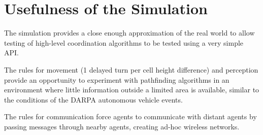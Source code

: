 \section{Usefulness of the Simulation}

The simulation provides a close enough approximation of the real world to allow testing of high-level coordination algorithms to be tested using a very simple API.

The rules for movement (1 delayed turn per cell height difference) and perception provide an opportunity to experiment with pathfinding algorithms in an environment where little information outside a limited area is available, similar to the conditions of the DARPA autonomous vehicle events.

The rules for communication force agents to communicate with distant agents by passing messages through nearby agents, creating ad-hoc wireless networks.
